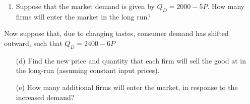 \documentclass[11pt]{article}
\begin{document}
\begin{enumerate}
\begin{enumerate}
    \item Suppose that the market demand is given by $Q_D = 2000 - 5P$. How many firms will enter the market in the long run?

  \end{enumerate}

  Now suppose that, due to changing tastes, consumer demand has shifted outward, such that $Q_D = 2400 - 6P$
  \begin{enumerate}
    \item[(d)] Find the new price and quantity that each firm will sell the good at in the long-run (assuming constant input prices).

    \item[(e)] How many additional firms will enter the market, in response to the increased demand?
  \end{enumerate}
  



\end{enumerate}
\end{document}
